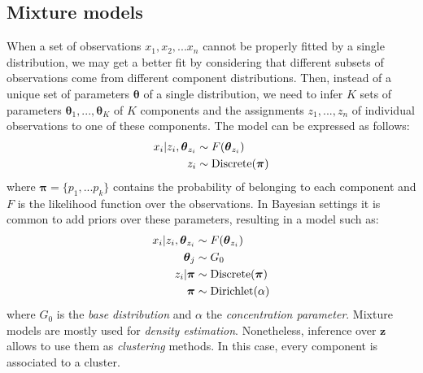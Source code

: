 \documentclass[smallextended]{svjour3}          %
\newcommand\alberto[1]{\textcolor{black}{#1}}
\begin{document}
\subsection{Mixture models}\label{sec:mixturemodels}
When a set of observations $x_1,x_2,...x_n$ cannot be properly fitted by a single distribution, we may get a better fit by considering that different subsets of observations come from different component distributions. Then, instead of a unique set of parameters $\boldsymbol{\theta}$ of a single distribution, we need to infer $K$ sets of parameters $\boldsymbol{\theta}_1,...,\boldsymbol{\theta}_K$ of $K$ components and the assignments $z_1,...,z_n$ of individual observations to one of these components. The model can be expressed as follows:
\begin{align}
x_i | z_i, \boldsymbol{\theta}_{z_i} &\sim F(\boldsymbol{\theta}_{z_i})\notag\\
z_i &\sim \text{Discrete}(\boldsymbol{\pi})
\end{align}
where $\boldsymbol{\pi} = \{p_1,...p_k\}$ contains the probability of belonging to each component and $F$ is the likelihood function over the observations. In Bayesian settings it is common to add priors over these parameters, resulting in a model such as:
\begin{align}
x_i | z_i, \boldsymbol{\theta}_{z_i} &\sim F(\boldsymbol{\theta}_{z_i})\notag\\
\boldsymbol{\theta}_j &\sim G_0\notag\\
z_i \alberto{| \boldsymbol{\pi}} &\sim \text{Discrete}(\boldsymbol{\pi})\notag\\
\boldsymbol{\pi} &\sim \text{Dirichlet}(\alpha)
\end{align}
where $G_0$ is the \emph{base distribution} and $\alpha$ the \textit{concentration parameter}. Mixture models are mostly used for \textit{density estimation}. Nonetheless, inference over $\mathbf{z}$ allows to use them as \textit{clustering} methods. In this case, every component is associated to a cluster.


\end{document}
